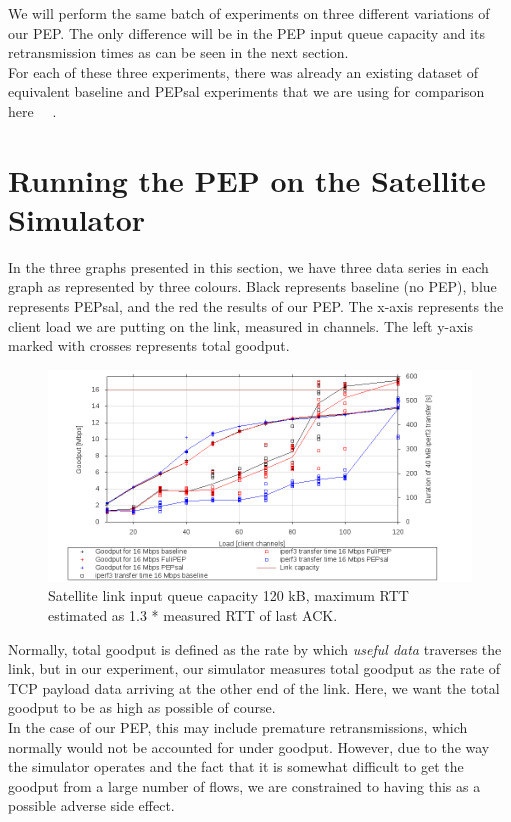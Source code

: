We will perform the same batch of experiments on three different variations of our PEP. The only difference will be in the PEP input queue capacity and its retransmission times as can be seen in the next section.\\

For each of these three experiments, there was already an existing dataset of equivalent baseline and PEPsal experiments that we are using for comparison here ~\cite{4}~\cite{21}. 

\section{Running the PEP on the Satellite Simulator}
In the three graphs presented in this section, we have three data series in each graph as represented by three colours. Black represents baseline (no PEP), blue represents PEPsal, and the red the results of our PEP. The x-axis represents the client load we are putting on the link, measured in channels. The left y-axis marked with crosses represents total goodput. \\


\begin{figure}[ht!]
    \centering
    \includegraphics[width=1.3\textwidth, angle =270]{120K.png}
    \caption{Satellite link input queue capacity 120 kB, maximum RTT estimated as 1.3 * measured RTT of last ACK.}
    \label{fig: 120K queues} 
\end{figure}

Normally, total goodput is defined as the rate by which \emph{useful data} traverses the link, but in our experiment, our simulator measures total goodput as the rate of TCP payload data arriving at the other end of the link. Here, we want the total goodput to be as high as possible of course. \\

In the case of our PEP, this may include premature retransmissions, which normally would not be accounted for under goodput. However, due to the way the simulator operates and the fact that it is somewhat difficult to get the goodput from a large number of flows, we are constrained to having this as a possible adverse side effect. \\

